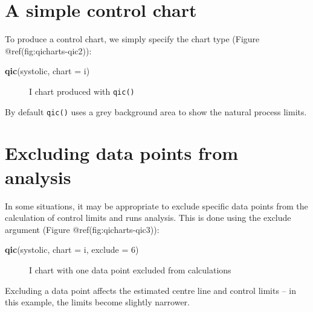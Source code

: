 \documentclass[
]{book}
\makeatletter
\newenvironment{Shaded}{\begin{snugshade}}{\end{snugshade}}
\newcommand{\AttributeTok}[1]{\textcolor[rgb]{0.13,0.29,0.53}{#1}}
\newcommand{\DecValTok}[1]{\textcolor[rgb]{0.00,0.00,0.81}{#1}}
\newcommand{\FunctionTok}[1]{\textcolor[rgb]{0.13,0.29,0.53}{\textbf{#1}}}
\newcommand{\NormalTok}[1]{#1}
\newcommand{\StringTok}[1]{\textcolor[rgb]{0.31,0.60,0.02}{#1}}
\newcommand*\pandocbounded[1]{%
  \sbox\pandoc@box{#1}%
  \Gscale@div\@tempa{\textheight}{\dimexpr\ht\pandoc@box+\dp\pandoc@box\relax}%
  \Gscale@div\@tempb{\linewidth}{\wd\pandoc@box}%
  \ifdim\@tempb\p@<\@tempa\p@\let\@tempa\@tempb\fi%
  \ifdim\@tempa\p@<\p@\scalebox{\@tempa}{\usebox\pandoc@box}%
  \else\usebox{\pandoc@box}%
  \fi%
}
\makeatother
\begin{document}
\section{A simple control chart}\label{a-simple-control-chart}

To produce a control chart, we simply specify the chart type (Figure
@ref(fig:qicharts-qic2)):

\begin{Shaded}
\begin{Highlighting}[]
\FunctionTok{qic}\NormalTok{(systolic, }\AttributeTok{chart =} \StringTok{\textquotesingle{}i\textquotesingle{}}\NormalTok{)}
\end{Highlighting}
\end{Shaded}

\begin{figure}
\centering
\pandocbounded{}
\caption{I chart produced with \protect\texttt{qic()}}
\end{figure}

By default \texttt{qic()} uses a grey background area to show the
natural process limits.

\section{Excluding data points from
analysis}\label{excluding-data-points-from-analysis}

In some situations, it may be appropriate to exclude specific data
points from the calculation of control limits and runs analysis. This is
done using the exclude argument (Figure @ref(fig:qicharts-qic3)):

\begin{Shaded}
\begin{Highlighting}[]
\FunctionTok{qic}\NormalTok{(systolic, }\AttributeTok{chart =} \StringTok{\textquotesingle{}i\textquotesingle{}}\NormalTok{, }\AttributeTok{exclude =} \DecValTok{6}\NormalTok{)}
\end{Highlighting}
\end{Shaded}

\begin{figure}
\centering
\pandocbounded{}
\caption{I chart with one data point excluded from calculations}
\end{figure}

Excluding a data point affects the estimated centre line and control
limits -- in this example, the limits become slightly narrower.
\end{document}
